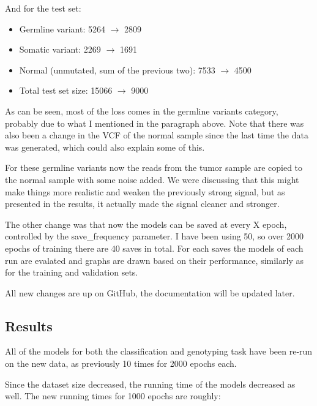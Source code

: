 \documentclass[11pt, a4paper]{article}
\begin{document}
And for the test set:

\begin{itemize}

\item Germline variant: 5264 $ \rightarrow $ 2809
\item Somatic variant: 2269 $ \rightarrow $ 1691
\item Normal (unmutated, sum of the previous two): 7533 $ \rightarrow $ 4500
\item Total test set size: 15066 $ \rightarrow $ 9000

\end{itemize}

As can be seen, most of the loss comes in the germline variants category, probably due to what I mentioned in the paragraph above. Note that there was also been a change in the VCF of the normal sample since the last time the data was generated, which could also explain some of this.

For these germline variants now the reads from the tumor sample are copied to the normal sample with some noise added. We were discussing that this might make things more realistic and weaken the previously strong signal, but as presented in the results, it actually made the signal cleaner and stronger.

The other change was that now the models can be saved at every X epoch, controlled by the save{\_}frequency parameter. I have been using 50, so over 2000 epochs of training there are 40 saves in total. For each saves the models of each run are evalated and graphs are drawn based on their performance, similarly as for the training and validation sets.

All new changes are up on GitHub, the documentation will be updated later.

\subsection{Results}

All of the models for both the classification and genotyping task have been re-run on the new data, as previously 10 times for 2000 epochs each.

Since the dataset size decreased, the running time of the models decreased as well. The new running times for 1000 epochs are roughly:
 
\end{document}
